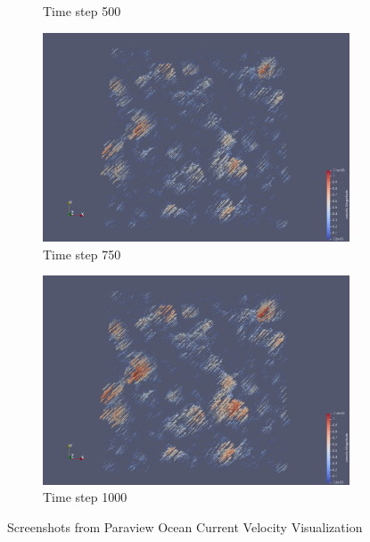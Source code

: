 \documentclass[a4paper,12pt]{article}
\begin{document}
\begin{figure}
\begin{subfigure}{0.4\textwidth}
    \caption{Time step 500}
\end{subfigure}
\hfill
\begin{subfigure}{0.4\textwidth}
    \includegraphics[width=\textwidth]{../images/vtk/bonus/velocity/step_75.png}
    \caption{Time step 750}
\end{subfigure}

\begin{subfigure}{0.4\textwidth}
    \includegraphics[width=\textwidth]{../images/vtk/bonus/velocity/step_100.png}
    \caption{Time step 1000}
\end{subfigure}
        
\caption{Screenshots from Paraview Ocean Current Velocity Visualization}
\end{figure}



\end{document}
